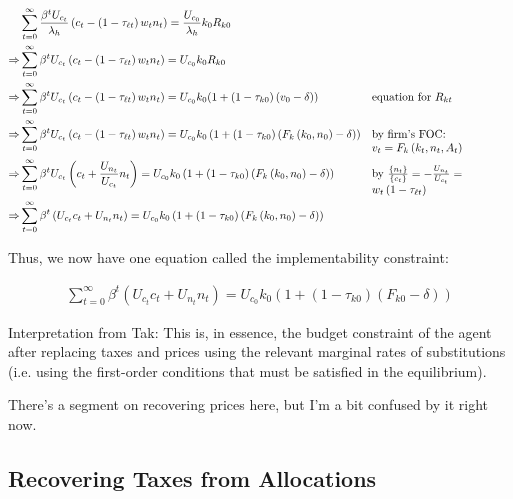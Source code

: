 \documentclass[10pt]{article}
\begin{document}
\begin{align}
    &\sum_{t=0}^{\infty} \frac{\beta^t U_{c_t}}{\lambda_h} \left(c_t-\left(1-\tau_{\ell t}\right) w_t n_t\right)=\frac{U_{c_0}}{\lambda_h} k_0 R_{k 0} \\
    \Rightarrow &\sum_{t=0}^{\infty} \beta^t U_{c_t}\left(c_t-\left(1-\tau_{\ell t}\right) w_t n_t\right)=U_{c_0} k_0 R_{k 0} \\
    \Rightarrow &\sum_{t=0}^{\infty} \beta^t U_{c_t}\left(c_t-\left(1-\tau_{\ell t}\right) w_t n_t\right)=U_{c_0} k_0 (1+\left(1-\tau_{k 0}\right)\left(v_0-\delta\right)) && \parbox[t]{4cm}{\raggedright equation for $R_{k t}$} \\
    \Rightarrow &\sum_{t=0}^{\infty} \beta^t U_{c_t}\left(c_t-\left(1-\tau_{\ell t}\right) w_t n_t\right)=U_{c_0} k_0 \left(1+\left(1-\tau_{k 0}\right)\left(F_k\left(k_0, n_0\right)-\delta\right)\right) && \parbox[t]{4cm}{\raggedright by firm's FOC: $v_t=F_k\left(k_t, n_t, A_t\right)$} \\
    \Rightarrow &\sum_{t=0}^{\infty} \beta^t U_{c_t}\left(c_t+\frac{U_{n_t}}{U_{c_t}} n_t\right) =U_{c_0} k_0 \left(1+\left(1-\tau_{k 0}\right)\left(F_k\left(k_0, n_0\right)-\delta\right)\right) && \parbox[t]{4cm}{\raggedright by $\frac{\{n_t\}}{\{c_t\}} = -\frac{U_{n_t}}{U_{c_t}}=w_t\left(1-\tau_{\ell t}\right)$} \\
    \Rightarrow &\sum_{t=0}^{\infty} \beta^t\left(U_{c_t} c_t+U_{n_t} n_t\right)=U_{c_0} k_0 \left(1+\left(1-\tau_{k 0}\right)\left(F_k\left(k_0, n_0\right)-\delta\right)\right)
\end{align}

Thus, we now have one equation called the 
implementability constraint:

\begin{align}
    \sum_{t=0}^{\infty} \beta^t\left(U_{c_t} c_t+U_{n_t} n_t\right)=U_{c_0} k_0\left(1+\left(1-\tau_{k 0}\right)\left(F_{k 0}-\delta\right)\right)
\end{align}

Interpretation from Tak:
This is, in essence, the budget constraint of the agent after replacing taxes and prices using the relevant marginal rates of substitutions (i.e. using the first-order conditions that must be satisfied in the equilibrium).

\begin{questions}
    There's a segment on recovering prices here, but I'm a bit confused by it right now.
\end{questions}

\subsection{Recovering Taxes from Allocations}
\end{document}
